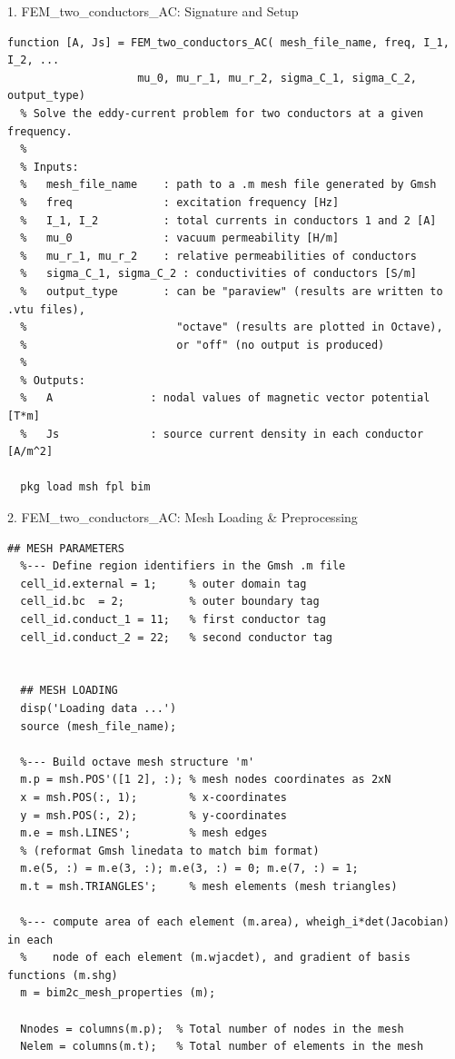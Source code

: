 \documentclass[aspectratio=54,xcolor=dvipsnames]{beamer}
\begin{document}
\begin{frame}[fragile]{1. FEM\_two\_conductors\_AC: Signature and Setup}
\small
\begin{lstlisting}
function [A, Js] = FEM_two_conductors_AC( mesh_file_name, freq, I_1, I_2, ...
                    mu_0, mu_r_1, mu_r_2, sigma_C_1, sigma_C_2, output_type)
  % Solve the eddy-current problem for two conductors at a given frequency.
  %
  % Inputs:
  %   mesh_file_name    : path to a .m mesh file generated by Gmsh
  %   freq              : excitation frequency [Hz]
  %   I_1, I_2          : total currents in conductors 1 and 2 [A]
  %   mu_0              : vacuum permeability [H/m]
  %   mu_r_1, mu_r_2    : relative permeabilities of conductors
  %   sigma_C_1, sigma_C_2 : conductivities of conductors [S/m]
  %   output_type       : can be "paraview" (results are written to .vtu files),
  %                       "octave" (results are plotted in Octave),
  %                       or "off" (no output is produced)
  %
  % Outputs:
  %   A               : nodal values of magnetic vector potential [T*m]
  %   Js              : source current density in each conductor [A/m^2]

  pkg load msh fpl bim

\end{lstlisting}
\end{frame}

\begin{frame}[fragile]{2. FEM\_two\_conductors\_AC: Mesh Loading \& Preprocessing}
\scriptsize
\begin{lstlisting}[firstnumber=22]
  ## MESH PARAMETERS
  %--- Define region identifiers in the Gmsh .m file
  cell_id.external = 1;     % outer domain tag
  cell_id.bc  = 2;          % outer boundary tag
  cell_id.conduct_1 = 11;   % first conductor tag
  cell_id.conduct_2 = 22;   % second conductor tag


  ## MESH LOADING
  disp('Loading data ...')
  source (mesh_file_name);

  %--- Build octave mesh structure 'm'
  m.p = msh.POS'([1 2], :); % mesh nodes coordinates as 2xN
  x = msh.POS(:, 1);        % x-coordinates
  y = msh.POS(:, 2);        % y-coordinates
  m.e = msh.LINES';         % mesh edges
  % (reformat Gmsh linedata to match bim format)
  m.e(5, :) = m.e(3, :); m.e(3, :) = 0; m.e(7, :) = 1;
  m.t = msh.TRIANGLES';     % mesh elements (mesh triangles)

  %--- compute area of each element (m.area), wheigh_i*det(Jacobian) in each 
  %    node of each element (m.wjacdet), and gradient of basis functions (m.shg)
  m = bim2c_mesh_properties (m);

  Nnodes = columns(m.p);  % Total number of nodes in the mesh
  Nelem = columns(m.t);   % Total number of elements in the mesh
  
\end{lstlisting}
\end{frame}
\end{document}
